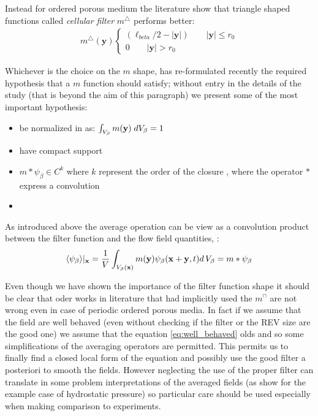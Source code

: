 Instead for ordered porous medium the literature show that triangle shaped functions called \textit{cellular filter}  $m^{\bigtriangleup}$  performs better:
\begin{eqnarray}
m^{\bigtriangleup}(\mathbf{y}) 
\begin{cases}
(\ell_{beta}/2 - |\mathbf{y}|) \qquad |\mathbf{y}| \leqslant r_0\\
0 \qquad |\mathbf{y}|> r_0
\end{cases}
\end{eqnarray}

Whichever is the choice on the $m$ shape, \citet{davit2017technical} has re-formulated recently the required hypothesis that a $m$ function should satisfy; without entry in the details of the study (that is beyond the aim of this paragraph) we present some of the most important hypothesis:
\begin{itemize}
	\item be normalized in as: $\int_{V_\beta}  m(\mathbf{y}) \; dV_\beta = 1$
	\item have compact support 
	\item $m*\psi_{\beta} \in C^{k}$ where $k$ represent the order of the closure , where the operator $*$ express a convolution
	\item 
\end{itemize}


As introduced above the average operation can be view as a convolution product between the filter function and the flow field quantities, \citet{marle1982macroscopic}:
$$
{\left< \psi_{\beta} \right>}|_{\mathbf{x}} = \dfrac{1}{V} \int_{V_\beta(\mathbf{x})} m(\mathbf{y}) \psi_{\beta}(\mathbf{x}+\mathbf{y}, t) d \, V_\beta = m*\psi_{\beta}
$$

Even though we have shown the importance of the filter function shape it should be clear that oder works in literature that had implicitly used the $m^{\sqcap}$ are not wrong even in case of periodic ordered porous media.
In fact if we assume that the field are well behaved (even without checking if the filter or the REV size are the good one) we assume that the equation \eqref{eq:well_behaved} olds and so some simplifications of the averaging operators are permitted.
This permits us to finally find a closed local form of the equation and possibly use the good filter a posteriori to smooth the fields.
However neglecting the use of the proper filter can translate in some problem interpretations of the averaged fields (as \citet{quintard1994transport1} show for the example case of hydrostatic pressure) so particular care should be used especially when making comparison to experiments.

